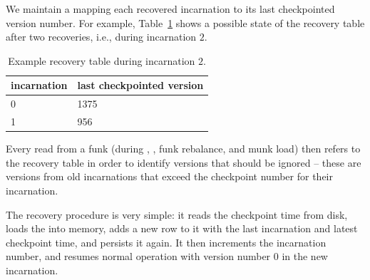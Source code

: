 We maintain a  mapping each recovered incarnation to its last checkpointed version number. 
For example, Table~\ref{table:recovery} shows a possible state of the recovery table after two recoveries, i.e., during incarnation $2$. 

\begin{table}[h]
\begin{center}
\begin{tabular}{ll}
incarnation & last checkpointed version \\
\hline
0 & 1375\\
1 &  956\\
\end{tabular}
\end{center}
\caption{Example recovery table during incarnation $2$.}
\label{table:recovery}
\end{table} 
 
Every read from a funk  (during ,  , funk rebalance,  and munk load) then
refers to the recovery table in order to identify versions that should be ignored -- these are versions from old incarnations that exceed the checkpoint number for their incarnation. 

The recovery procedure is very simple: it reads the checkpoint time from disk, loads the  into memory, adds a new row to it with the last incarnation and latest checkpoint time, and persists it again. It then increments the incarnation number, and resumes normal operation with version number $0$ in the new incarnation.












